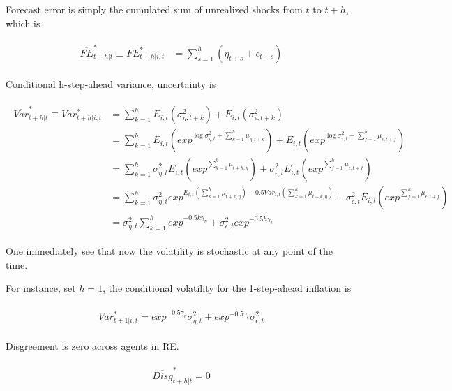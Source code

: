 \documentclass[]{article}
\begin{document}
Forecast error is simply the cumulated sum of unrealized shocks from $t$ to $t+h$, which is 

\begin{eqnarray}
	\begin{split}
		\overline{FE}^*_{t+h|t} \equiv  FE^*_{t+h|i,t} & =  \sum^{h}_{s=1} (\eta_{t+s} + \epsilon_{t+s})
	\end{split}
\end{eqnarray}



Conditional h-step-ahead variance, uncertainty is

\begin{eqnarray}
	\begin{split}
		\overline{Var}^*_{t+h|t} \equiv  Var^*_{t+h|i,t} & = \sum^{h}_{k=1} E_{i,t}(\sigma^2_{\eta,t+k}) +  E_{i,t}(\sigma^2_{\epsilon,t+k})  \\
		& = \sum^{h}_{k=1} E_{i,t}(exp^{\log \sigma^2_{\eta,t}+\sum^h_{k=1}\mu_{\eta,t+k}}) +  E_{i,t}(exp^{\log \sigma^2_{\epsilon,t}+\sum^h_{f=1}\mu_{\epsilon,t+f}} ) \\
		& = \sum^{h}_{k=1}\sigma^2_{\eta,t} E_{i,t}(exp^{\sum^h_{k=1}\mu_{t+h,\eta}}) +  \sigma^2_{\epsilon,t} E_{i,t}(exp^{\sum^h_{f=1}\mu_{\epsilon,t+f}} ) \\
		& = \sum^{h}_{k=1}\sigma^2_{\eta,t}  exp^{E_{i,t}({\sum^h_{k=1}\mu_{t+k,\eta}})- 0.5Var_{i,t}(\sum^h_{k=1}\mu_{t+k,\eta})} +  \sigma^2_{\epsilon,t} E_{i,t}(exp^{\sum^h_{f=1}\mu_{\epsilon,t+f}} ) \\
		& = \sigma^2_{\eta,t} \sum^{h}_{k=1} exp^{- 0.5k\gamma_{\eta}} +  \sigma^2_{\epsilon,t} exp^{- 0.5h\gamma_{\epsilon}} 
	\end{split} 
\end{eqnarray}

One immediately see that now the volatility is stochastic at any point of the time. 

For instance, set $h=1$, the conditional volatility for the 1-step-ahead inflation is 

\begin{eqnarray}
	\begin{split}
		Var^*_{t+1|i,t} =  exp^{- 0.5\gamma_{\eta}} \sigma^2_{\eta,t}  +  exp^{- 0.5\gamma_{\epsilon}} \sigma^2_{\epsilon,t} 
	\end{split} 
\end{eqnarray}

Disgreement is zero across agents in RE.


\begin{eqnarray}
	\begin{split}
		\overline{Disg}^*_{t+h|t} =  0 
	\end{split} 
\end{eqnarray}
\end{document}
